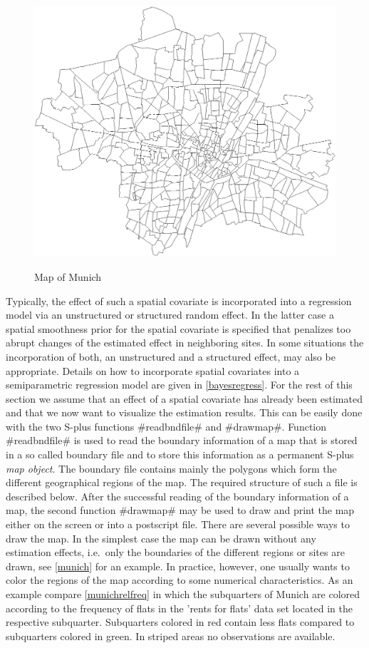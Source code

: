 \begin{figure}
\centering
\includegraphics [scale=0.5]{grafiken/munich.eps}
{\em\caption{\label{munich} Map of Munich}}
\end{figure}


Typically, the effect of such a spatial covariate is incorporated
into a regression model via an unstructured or structured random
effect. In the latter case a spatial smoothness prior for the
spatial covariate is specified that penalizes too abrupt changes
of the estimated effect in neighboring sites. In some situations
the incorporation of both, an unstructured and a structured
effect, may also be appropriate. Details on how to incorporate
spatial covariates into a semiparametric regression  model are
given in \autoref{bayesregress}. For the rest of this section we
assume that an effect of a spatial covariate has already been
estimated and that we now want to visualize the estimation
results. This can be easily done with the two S-plus functions
#readbndfile# and #drawmap#. Function #readbndfile# is used to
read the boundary information of a map that is stored in a so
called boundary file and to store this information as a permanent
S-plus {\em map object}. The boundary file contains mainly the
polygons which form the different geographical regions of the map.
The required structure of such a file is described below. After
the successful reading of the boundary information of a map, the
second function #drawmap# may be used to draw and print the map
either on the screen or into a postscript file. There are several
possible ways to draw the map. In the simplest case the map can be
drawn without any estimation effects, i.e.~only the boundaries of
the different regions or sites are drawn, see \autoref{munich} for
an example. In practice, however, one usually wants to color the
regions of the map according to some numerical characteristics. As
an example compare \autoref{munichrelfreq} in which the
subquarters of Munich are colored according to the frequency of
flats in the 'rents for flats' data set located in the respective subquarter.
Subquarters colored in red contain less flats compared to
subquarters colored in green. In striped areas no observations are
available.

